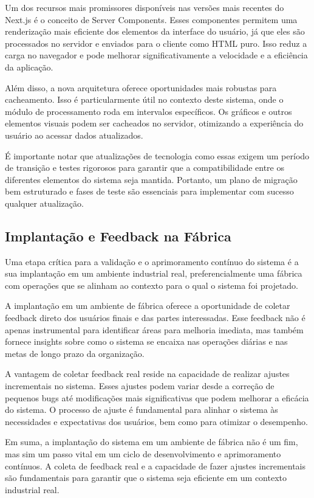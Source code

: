 Um dos recursos mais promissores disponíveis nas versões mais recentes do Next.js é o conceito de Server Components. Esses componentes permitem uma renderização mais eficiente dos elementos da interface do usuário, já que eles são processados no servidor e enviados para o cliente como HTML puro. Isso reduz a carga no navegador e pode melhorar significativamente a velocidade e a eficiência da aplicação.

Além disso, a nova arquitetura oferece oportunidades mais robustas para cacheamento. Isso é particularmente útil no contexto deste sistema, onde o módulo de processamento roda em intervalos específicos. Os gráficos e outros elementos visuais podem ser cacheados no servidor, otimizando a experiência do usuário ao acessar dados atualizados.

É importante notar que atualizações de tecnologia como essas exigem um período de transição e testes rigorosos para garantir que a compatibilidade entre os diferentes elementos do sistema seja mantida. Portanto, um plano de migração bem estruturado e fases de teste são essenciais para implementar com sucesso qualquer atualização.


\subsection{Implantação e Feedback na Fábrica}

Uma etapa crítica para a validação e o aprimoramento contínuo do sistema é a sua implantação em um ambiente industrial real, preferencialmente uma fábrica com operações que se alinham ao contexto para o qual o sistema foi projetado.

A implantação em um ambiente de fábrica oferece a oportunidade de coletar feedback direto dos usuários finais e das partes interessadas. Esse feedback não é apenas instrumental para identificar áreas para melhoria imediata, mas também fornece insights sobre como o sistema se encaixa nas operações diárias e nas metas de longo prazo da organização.

A vantagem de coletar feedback real reside na capacidade de realizar ajustes incrementais no sistema. Esses ajustes podem variar desde a correção de pequenos bugs até modificações mais significativas que podem melhorar a eficácia do sistema. O processo de ajuste é fundamental para alinhar o sistema às necessidades e expectativas dos usuários, bem como para otimizar o desempenho.


Em suma, a implantação do sistema em um ambiente de fábrica não é um fim, mas sim um passo vital em um ciclo de desenvolvimento e aprimoramento contínuos. A coleta de feedback real e a capacidade de fazer ajustes incrementais são fundamentais para garantir que o sistema seja eficiente em um contexto industrial real.











